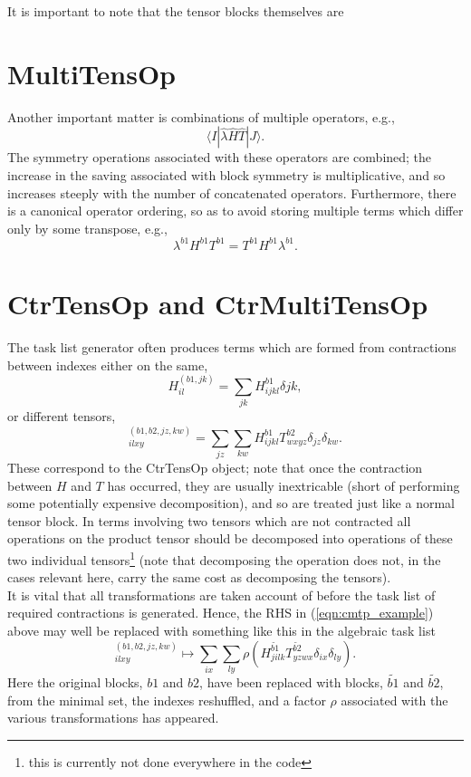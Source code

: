 \noindent It is important to note that the tensor blocks themselves are 

\section{ MultiTensOp } 
\noindent Another important matter is combinations of multiple operators, e.g.,
\begin{equation}
\langle I | \hat{\lambda}\hat{H}\hat{T} | J \rangle .
\end{equation}
The symmetry operations associated with these operators are combined; the increase in the saving
associated with block symmetry is multiplicative, and so increases steeply with
the number of concatenated operators. Furthermore, there is a canonical
operator ordering, so as to avoid storing multiple terms which differ only by some transpose, 
e.g., 
\begin{equation}
\lambda^{b1}H^{b1}T^{b1} = T^{b1}H^{b1}\lambda^{b1}. 
\label{eqn:tens_block_combined}
\end{equation}
\section{CtrTensOp and CtrMultiTensOp}
The task list generator often produces terms which are formed from contractions between indexes either
on the same,
\begin{equation*}
H^{(b1,jk)}_{il} = \sum_{jk} H^{b1}_{ijkl}\delta{jk},
\end{equation*}
or different tensors, 
\begin{equation}
[HT]^{(b1,b2,jz,kw)}_{ilxy} = \sum_{jz} \sum_{kw} H^{b1}_{ijkl}T^{b2}_{wxyz}\delta_{jz}\delta_{kw}.
\label{eqn:cmtp_example}
\end{equation}
These correspond to the CtrTensOp object; note that once the contraction between $H$ and $T$ has occurred, they
are usually inextricable (short of performing some potentially expensive decomposition), and so 
are treated just like a normal tensor block. In terms involving two
tensors which are not contracted all operations on the product tensor should be decomposed into operations of these 
two individual tensors\footnote{this is currently not done everywhere in the code} (note that decomposing the
operation does not, in the cases relevant here, carry the same cost as decomposing the tensors).\\

\noindent It is vital that all transformations are taken account of before the task list of required contractions
is generated. Hence, the RHS in (\ref{eqn:cmtp_example}) above may well be replaced with something like this in
the algebraic task list
\begin{equation}
[HT]^{(b1,b2,jz,kw)}_{ilxy} \mapsto \sum_{ix} \sum_{ly} \rho(H^{\tilde{b1}}_{jilk}T^{\tilde{b2}}_{yzwx}\delta_{ix}\delta_{ly}).
\label{eqn:cmtp_example_symm}
\end{equation}
\noindent Here the original blocks,  $b1$ and $b2$, have been replaced with blocks, $\tilde{b1}$ and $\tilde{b2}$,
from the minimal set, the indexes reshuffled, and a factor $\rho$ associated with the various transformations has appeared. 

